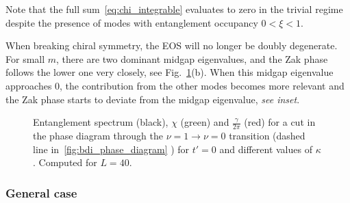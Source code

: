 \documentclass[twocolumn,amsmath,longbibliography,amssymb,superscriptaddress]{revtex4-1}
\newcommand{\carlos}[1]{{\color{red} #1}}
\newcommand{\mariac}[1]{{\it\color{cyan}#1}}
\begin{document}
Note that the full sum~\eqref{eq:chi_integrable}  evaluates to zero in the trivial regime %
despite the presence of modes with entanglement occupancy $0<\xi<1$. 

When breaking chiral symmetry, the EOS will no longer be doubly degenerate. 
For small $m$, there are two dominant midgap eigenvalues, and the Zak phase follows the lower one very closely, see Fig.~\ref{huang}(b).
When this midgap eigenvalue approaches  0, the contribution from the other modes becomes more relevant and the Zak phase starts to deviate from the midgap eigenvalue, \mariac{see inset}.
\begin{figure}[t]
\centering
{}
\caption{Entanglement spectrum (black), $\chi$ (green) and $\frac{\gamma}{2\pi}$ (red) for a cut in the phase diagram through the $\nu = 1 \rightarrow \nu = 0$ transition (dashed line in~\ref{fig:bdi_phase_diagram}
	) for $t'=0$ and different values of $\kappa$. Computed for $L=40$.}
\label{huang}
\end{figure}

\subsubsection{General case}
\end{document}
